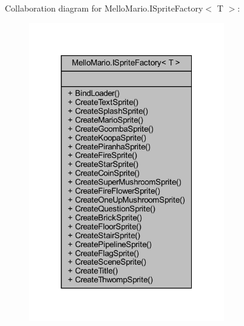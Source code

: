 Collaboration diagram for Mello\+Mario.\+I\+Sprite\+Factory$<$ T $>$\+:
\nopagebreak
\begin{figure}[H]
\begin{center}
\leavevmode
\includegraphics[width=241pt]{interfaceMelloMario_1_1ISpriteFactory__coll__graph}
\end{center}
\end{figure}
